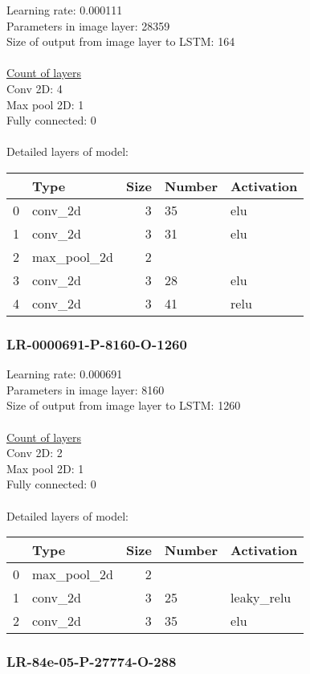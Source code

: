 Learning rate: 0.000111
\\Parameters in image layer: 28359
\\Size of output from image layer to LSTM: 164
\\\\\underline{Count of layers} 
\\Conv 2D:           4\\Max pool 2D:      1\\Fully connected:  0
\\\\Detailed layers of model: \\\begin{tabular}{rlrll}
\hline
    & Type        &   Size & Number   & Activation   \\
\hline
  0 & conv\_2d     &      3 & 35       & elu          \\
  1 & conv\_2d     &      3 & 31       & elu          \\
  2 & max\_pool\_2d &      2 &          &              \\
  3 & conv\_2d     &      3 & 28       & elu          \\
  4 & conv\_2d     &      3 & 41       & relu         \\
\hline
\end{tabular}\subsubsection*{LR-0000691-P-8160-O-1260}
Learning rate: 0.000691
\\Parameters in image layer: 8160
\\Size of output from image layer to LSTM: 1260
\\\\\underline{Count of layers} 
\\Conv 2D:           2\\Max pool 2D:      1\\Fully connected:  0
\\\\Detailed layers of model: \\\begin{tabular}{rlrll}
\hline
    & Type        &   Size & Number   & Activation   \\
\hline
  0 & max\_pool\_2d &      2 &          &              \\
  1 & conv\_2d     &      3 & 25       & leaky\_relu   \\
  2 & conv\_2d     &      3 & 35       & elu          \\
\hline
\end{tabular}\subsubsection*{LR-84e-05-P-27774-O-288}
